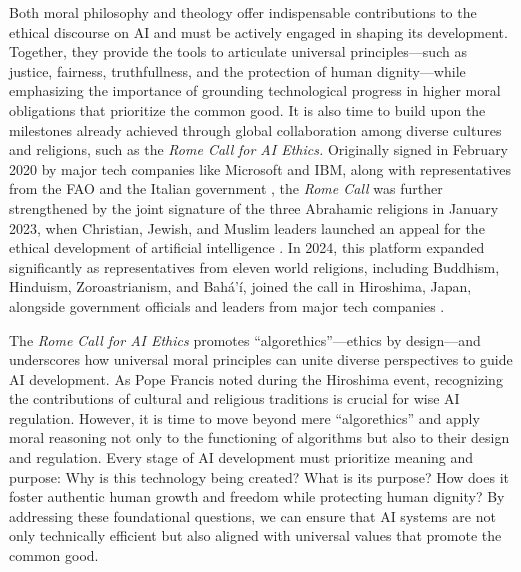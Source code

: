 \documentclass[%
  manuscript=article,
  year=2024,
  volume=77,
  doi=00000.000,
]{zfn}
\begin{document}
Both moral philosophy and theology offer indispensable contributions to the ethical discourse on AI and must be actively engaged in shaping its development. Together, they provide the tools to articulate universal principles---such as justice, fairness, truthfullness, and the protection of human dignity---while emphasizing the importance of grounding technological progress in higher moral obligations that prioritize the common good. It is also time to build upon the milestones already achieved through global collaboration among diverse cultures and religions, such as the \textit{Rome Call} \textit{for AI Ethics.} Originally signed in February 2020 by major tech companies like Microsoft and IBM, along with representatives from the FAO and the Italian government 
\parencite[][]{nelson_rome_2022}, %
 the \textit{Rome Call} was further strengthened by the joint signature of the three Abrahamic religions in January 2023, when Christian, Jewish, and Muslim leaders launched an appeal for the ethical development of artificial intelligence 
\parencite[][]{renaissance_foundation_ai_2023}. %
 In 2024, this platform expanded significantly as representatives from eleven world religions, including Buddhism, Hinduism, Zoroastrianism, and Bahá'í, joined the call in Hiroshima, Japan, alongside government officials and leaders from major tech companies 
\parencite[][]{vatican_press_office_ai_2024}.%




The \textit{Rome Call for AI Ethics} promotes ``algorethics''---ethics by design---and underscores how universal moral principles can unite diverse perspectives to guide AI development. As Pope Francis noted during the Hiroshima event, recognizing the contributions of cultural and religious traditions is crucial for wise AI regulation. However, it is time to move beyond mere ``algorethics'' and apply moral reasoning not only to the functioning of algorithms but also to their design and regulation. Every stage of AI development must prioritize meaning and purpose: Why is this technology being created? What is its purpose? How does it foster authentic human growth and freedom while protecting human dignity? By addressing these foundational questions, we can ensure that AI systems are not only technically efficient but also aligned with universal values that promote the common good.
\end{document}

